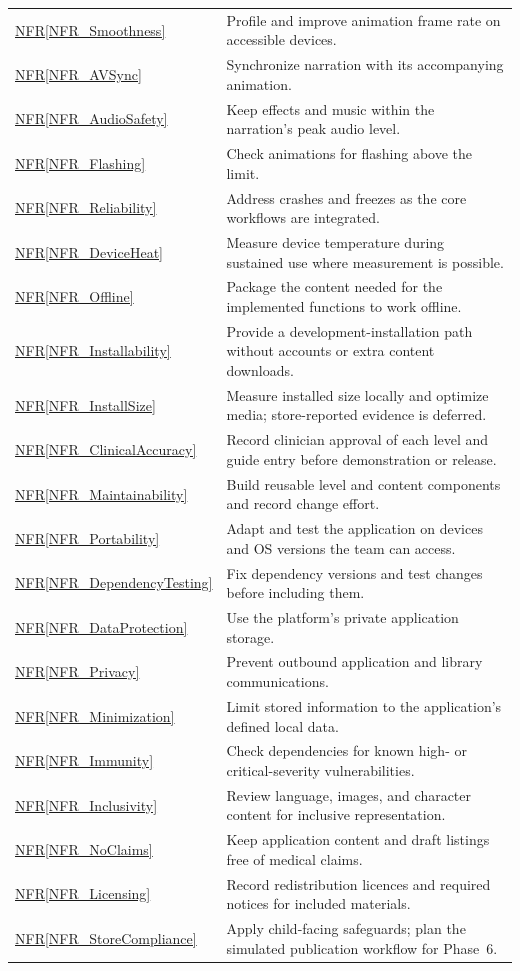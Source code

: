 \documentclass[10pt]{article}
\newcommand{\nfrref}[1]{\hyperref[#1]{NFR\ref*{#1}}}
\begin{document}
\begin{longtable}{@{}>{\raggedright\arraybackslash}p{}
>{\raggedright\arraybackslash}p{}@{}}
\nfrref{NFR_Smoothness} & Profile and improve animation frame rate on accessible devices. \\
\nfrref{NFR_AVSync} & Synchronize narration with its accompanying animation. \\
\nfrref{NFR_AudioSafety} & Keep effects and music within the narration's peak audio level. \\
\nfrref{NFR_Flashing} & Check animations for flashing above the limit. \\
\nfrref{NFR_Reliability} & Address crashes and freezes as the core workflows are integrated. \\
\nfrref{NFR_DeviceHeat} & Measure device temperature during sustained use where measurement is possible. \\
\nfrref{NFR_Offline} & Package the content needed for the implemented functions to work offline. \\
\nfrref{NFR_Installability} & Provide a development-installation path without accounts or extra content downloads. \\
\nfrref{NFR_InstallSize} & Measure installed size locally and optimize media; store-reported evidence is deferred. \\
\nfrref{NFR_ClinicalAccuracy} & Record clinician approval of each level and guide entry before demonstration or release. \\
\nfrref{NFR_Maintainability} & Build reusable level and content components and record change effort. \\
\nfrref{NFR_Portability} & Adapt and test the application on devices and OS versions the team can access. \\
\nfrref{NFR_DependencyTesting} & Fix dependency versions and test changes before including them. \\
\nfrref{NFR_DataProtection} & Use the platform's private application storage. \\
\nfrref{NFR_Privacy} & Prevent outbound application and library communications. \\
\nfrref{NFR_Minimization} & Limit stored information to the application's defined local data. \\
\nfrref{NFR_Immunity} & Check dependencies for known high- or critical-severity vulnerabilities. \\
\nfrref{NFR_Inclusivity} & Review language, images, and character content for inclusive representation. \\
\nfrref{NFR_NoClaims} & Keep application content and draft listings free of medical claims. \\
\nfrref{NFR_Licensing} & Record redistribution licences and required notices for included materials. \\
\nfrref{NFR_StoreCompliance} & Apply child-facing safeguards; plan the simulated publication workflow for Phase~6. \\
\end{longtable}
\endgroup
\end{document}
